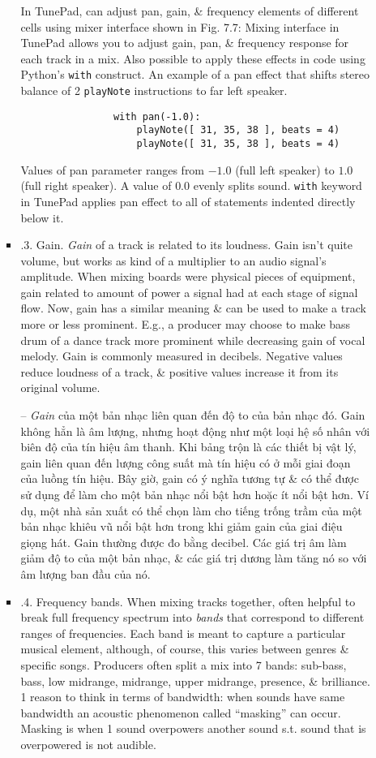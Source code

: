 \documentclass{article}
\begin{document}
\begin{itemize}
\begin{itemize}
\begin{itemize}
			In TunePad, can adjust pan, gain, \& frequency elements of different cells using mixer interface shown in {\sf Fig. 7.7: Mixing interface in TunePad allows you to adjust gain, pan, \& frequency response for each track in a mix}. Also possible to apply these effects in code using Python's {\tt with} construct. An example of a pan effect that shifts stereo balance of 2 {\tt playNote} instructions to far left speaker.
			\begin{verbatim}
				with pan(-1.0):
				    playNote([ 31, 35, 38 ], beats = 4)
				    playNote([ 31, 35, 38 ], beats = 4)
			\end{verbatim}
			Values of pan parameter ranges from $-1.0$ (full left speaker) to $1.0$ (full right speaker). A value of $0.0$ evenly splits sound. {\tt with} keyword in TunePad applies pan effect to all of statements indented directly below it.
			\item {.3. Gain.} {\it Gain} of a track is related to its loudness. Gain isn't quite volume, but works as kind of a multiplier to an audio signal's amplitude. When mixing boards were physical pieces of equipment, gain related to amount of power a signal had at each stage of signal flow. Now, gain has a similar meaning \& can be used to make a track more or less prominent. E.g., a producer may choose to make bass drum of a dance track more prominent while decreasing gain of vocal melody. Gain is commonly measured in decibels. Negative values reduce loudness of a track, \& positive values increase it from its original volume.
			
			-- {\it Gain} của một bản nhạc liên quan đến độ to của bản nhạc đó. Gain không hẳn là âm lượng, nhưng hoạt động như một loại hệ số nhân với biên độ của tín hiệu âm thanh. Khi bảng trộn là các thiết bị vật lý, gain liên quan đến lượng công suất mà tín hiệu có ở mỗi giai đoạn của luồng tín hiệu. Bây giờ, gain có ý nghĩa tương tự \& có thể được sử dụng để làm cho một bản nhạc nổi bật hơn hoặc ít nổi bật hơn. Ví dụ, một nhà sản xuất có thể chọn làm cho tiếng trống trầm của một bản nhạc khiêu vũ nổi bật hơn trong khi giảm gain của giai điệu giọng hát. Gain thường được đo bằng decibel. Các giá trị âm làm giảm độ to của một bản nhạc, \& các giá trị dương làm tăng nó so với âm lượng ban đầu của nó.
			\item {.4. Frequency bands.} When mixing tracks together, often helpful to break full frequency spectrum into {\it bands} that correspond to different ranges of frequencies. Each band is meant to capture a particular musical element, although, of course, this varies between genres \& specific songs. Producers often split a mix into 7 bands: sub-bass, bass, low midrange, midrange, upper midrange, presence, \& brilliance. 1 reason to think in terms of bandwidth: when sounds have same bandwidth an acoustic phenomenon called ``masking'' can occur. Masking is when 1 sound overpowers another sound s.t. sound that is overpowered is not audible.
			

\end{itemize}
\end{itemize}
\end{itemize}
\end{document}
